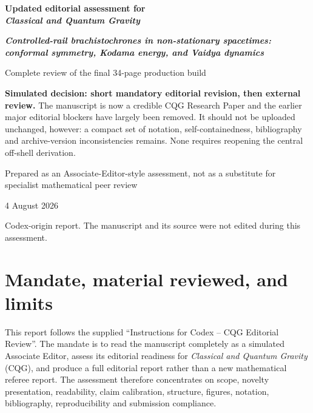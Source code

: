 \documentclass[11pt,a4paper]{article}
\newcommand{\paper}{\emph{Controlled-rail brachistochrones in non-stationary spacetimes: conformal symmetry, Kodama energy, and Vaidya dynamics}}
\begin{document}
\hypersetup{pageanchor=false}

\begin{titlepage}
  \centering
  \vspace*{1.5cm}
  {\Large\bfseries Updated editorial assessment for\\[0.35em]
  \emph{Classical and Quantum Gravity}\par}
  \vspace{1.2cm}
  {\LARGE\bfseries \paper\par}
  \vspace{0.8cm}
  {\large Complete review of the final 34-page production build\par}
  \vspace{1.3cm}
  \begin{minipage}{0.87\textwidth}
    \colorbox{LightAmber}{\parbox{0.93\textwidth}{
      \textbf{Simulated decision: short mandatory editorial revision, then external review.}
      The manuscript is now a credible CQG Research Paper and the earlier major editorial
      blockers have largely been removed. It should not be uploaded unchanged, however:
      a compact set of notation, self-containedness, bibliography and archive-version
      inconsistencies remains. None requires reopening the central off-shell derivation.
    }}
  \end{minipage}
  \vfill
  {\large Prepared as an Associate-Editor-style assessment, not as a substitute for\\
  specialist mathematical peer review\par}
  \vspace{0.45cm}
  {\large 4 August 2026\par}
  \vspace{1.1cm}
  {\small Codex-origin report. The manuscript and its source were not edited during this assessment.\par}
\end{titlepage}

\hypersetup{pageanchor=true}
\tableofcontents
\clearpage
{}

\section{Mandate, material reviewed, and limits}

This report follows the supplied ``Instructions for Codex -- CQG Editorial Review''. The
mandate is to read the manuscript completely as a simulated Associate Editor, assess its
editorial readiness for \emph{Classical and Quantum Gravity} (CQG), and produce a full
editorial report rather than a new mathematical referee report. The assessment therefore
concentrates on scope, novelty presentation, readability, claim calibration, structure,
figures, notation, bibliography, reproducibility and submission compliance.
\end{document}
